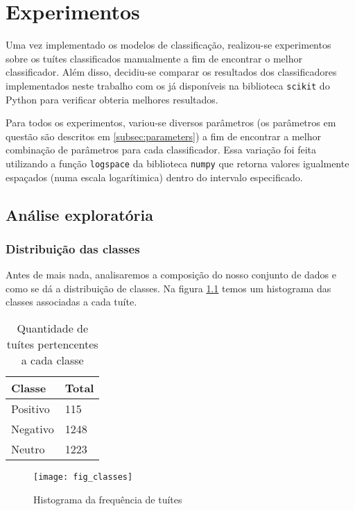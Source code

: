 \chapter{Experimentos}

Uma vez implementado os modelos de classificação, realizou-se experimentos sobre os tuítes
classificados manualmente a fim de encontrar o melhor classificador. Além disso, decidiu-se
comparar os resultados dos classificadores implementados neste trabalho com os já disponíveis
na biblioteca \texttt{scikit} do Python para verificar obteria melhores resultados.

Para todos os experimentos, variou-se diversos parâmetros (os parâmetros em questão são descritos
em \ref{subsec:parameters}) a fim de encontrar a melhor combinação de parâmetros para cada 
classificador. Essa variação foi feita utilizando a função \texttt{logspace} da biblioteca
\texttt{numpy} que retorna valores igualmente espaçados (numa escala logarítimica) dentro do intervalo 
especificado.

\section{Análise exploratória}

\subsection{Distribuição das classes}

Antes de mais nada, analisaremos a composição do nosso conjunto de dados e como se dá
a distribuição de classes. Na figura \ref{fig:classes} temos um histograma das classes associadas
a cada tuíte.

\begin{table}[H]
	\begin{center}
		\begin{tabular}{| l | l |}
			\hline
			Classe & Total \\
			\hline
			Positivo & 115 \\
			\hline 
			Negativo & 1248 \\ 
			\hline
			Neutro & 1223 \\ 
			\hline
		\end{tabular}
	\end{center}
	\caption{Quantidade de tuítes pertencentes a cada classe}
	\label{tab:distribution}
\end{table}

\begin{center}
	\begin{figure}[H]
		\texttt{[image: fig\_classes]}
		\caption{Histograma da frequência de tuítes}
		\label{fig:classes}
	\end{figure}
\end{center}

